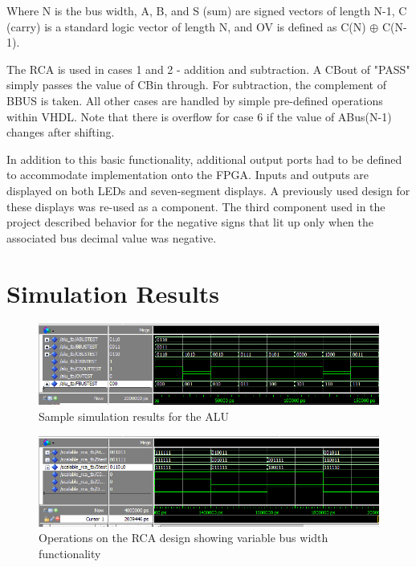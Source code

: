 \documentclass[12pt]{article}
\begin{document}
Where N is the bus width, A, B, and S (sum) are signed vectors of length N-1, C (carry) is a standard logic vector of length N, and OV is defined as C(N) $\oplus$ C(N-1).

\vspace{14.5pt}

The RCA is used in cases 1 and 2 - addition and subtraction.  A CBout of "PASS" simply passes the value of CBin through.  For subtraction, the complement of B\textunderscore BUS is taken. All other cases are handled by simple pre-defined operations within VHDL.   Note that there is overflow for case 6 if the value of A\textunderscore Bus(N-1) changes after shifting.\par
In addition to this basic functionality, additional output ports had to be defined to accommodate implementation onto the FPGA.  Inputs and outputs are displayed on both LEDs and seven-segment displays.  A previously used design for these displays was re-used as a component.  The third component used in the project described behavior for the negative signs that lit up only when the associated bus decimal value was negative.

\newpage

\section{Simulation Results} \label{simresults}

\begin{figure}[H]
\begin{center}
\includegraphics[scale=0.7]{ALU_sim.png}
\caption{Sample simulation results for the ALU}
\label{fig:simalu0}
\end{center}
\end{figure}

\begin{figure}[H]
\begin{center}
\includegraphics[scale=0.7]{rca_sim_results_example.png}
\caption{Operations on the RCA design showing variable bus width functionality}
\label{fig:simrca0}
\end{center}
\end{figure}
\end{document}

